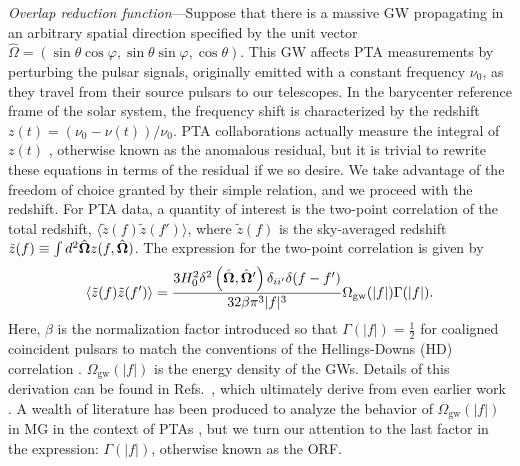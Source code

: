 \documentclass[prd,twocolumn,aps,psfig,nofootinbib,nobibnotes,superscriptaddress,preprintnumbers,times]{revtex4-2}
\begin{document}
\textit{Overlap reduction function}---Suppose that there is a massive GW propagating in an arbitrary spatial direction specified by the unit vector $\hat{\Omega} = (\sin\theta \cos\varphi,
                        \sin\theta \sin\varphi,
                        \cos\theta)$.
This GW affects PTA measurements by perturbing the pulsar signals, originally emitted with a constant frequency $\nu_0$, as they travel from their source pulsars to our telescopes. In the barycenter reference frame of the solar system, the frequency shift is characterized by the redshift $z(t) = (\nu_0 - \nu(t))/\nu_0$. PTA collaborations actually measure the integral of $z(t)$ \cite{Anholm:2008wy, Dahal:2020}, otherwise known as the anomalous residual, but it is trivial to rewrite these equations in terms of the residual if we so desire. We take advantage of the freedom of choice granted by their simple relation, and we proceed with the redshift. For PTA data, a quantity of interest is the two-point correlation of the total redshift, $\langle \tilde{z}(f) \tilde{z}(f') \rangle$, where $\tilde{z}(f)$ is the sky-averaged redshift $\tilde{z}(f) \equiv \int d^2\hat{\bf \Omega} z(f, \hat{\bf \Omega})$. The expression for the two-point correlation is given by
\begin{equation}\label{eqn:two_point_z}
    \langle \tilde{z}(f) \tilde{z}(f') \rangle = \frac{3H_0^2\delta^2\left(\hat{\bf \Omega} , \hat{\bf \Omega}'\right)\delta_{ii'}\delta(f - f')}{32 \beta \pi^3|f|^3}\Omega_{\text{gw}}(|f|) \Gamma(|f|).
\end{equation}
Here, $\beta$ is the normalization factor introduced so that $\Gamma(|f|) = \frac{1}{2}$ for coaligned coincident pulsars to match the conventions of the Hellings-Downs (HD) correlation \cite{Romano:2023zhb}. $\Omega_{\text{gw}}(|f|)$ is the energy density of the GWs. Details of this derivation can be found in Refs.~\cite{Anholm:2008wy, Liang:2021bct}, which ultimately derive from even earlier work \cite{Detweiler:1979wn, Estabrook:1975jtn, Kaufmann:1970}. A wealth of literature has been produced to analyze the behavior of $\Omega_{\text{gw}}(|f|)$ in MG in the context of PTAs \cite{Choi:2023tun, Wu:2023rib, Kenjale:2024rsc, He:2021bqm}, but we turn our attention to the last factor in the expression: $\Gamma(|f|)$, otherwise known as the ORF. 
\end{document}
